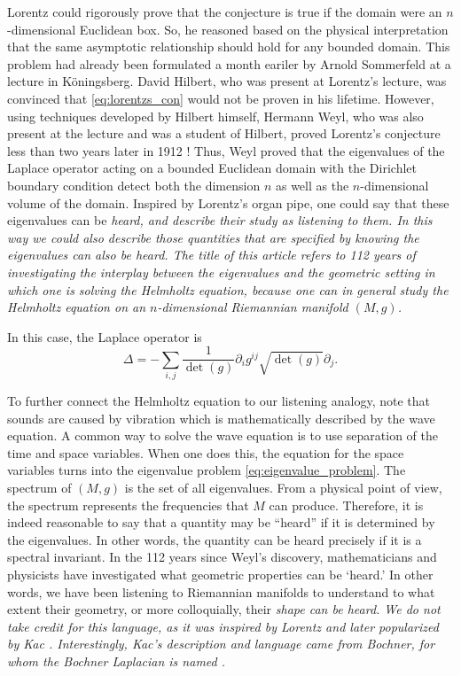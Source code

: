 \documentclass{amsart}
\theoremstyle{definition}
\begin{document}
Lorentz could rigorously prove that the conjecture is true if the domain were an $n$-dimensional Euclidean box. So, he reasoned based on the physical interpretation  that the same asymptotic relationship should hold for any bounded domain. This problem had already been formulated a month eariler by Arnold Sommerfeld at a lecture in Köningsberg. David Hilbert, who was present at Lorentz's lecture, was convinced that \eqref{eq:lorentzs_con} would not be proven in his lifetime. However, using techniques developed by Hilbert himself, Hermann Weyl, who was also present at the lecture and was a student of Hilbert, proved Lorentz's conjecture less than two years later in 1912 \cite{weyl1912asymptotische}!  Thus, Weyl proved that the eigenvalues of the Laplace operator acting on a bounded Euclidean domain with the Dirichlet boundary condition detect both the  dimension $n$ as well as the $n$-dimensional volume of the domain. Inspired by Lorentz's organ pipe, one could say that these eigenvalues can be \em heard, \em and describe their study as \em listening \em to them.  In this way we could also describe those quantities that are specified by knowing the eigenvalues can also be \em heard.  \em  The title of this article refers to 112 years of investigating the interplay between the eigenvalues and the geometric setting in which one is solving the Helmholtz equation, because one can in general study the Helmholtz equation on an $n$-dimensional Riemannian manifold $(M,g)$.  

In this case, the Laplace operator 
is 
\begin{equation} \label{eq:Laplace_(M,g)}
    \Delta = -\sum_{i,j} \frac{1}{\det(g)}\partial_i g^{ij}\sqrt{\det(g)}\partial_j.
\end{equation}

To further connect the Helmholtz equation to our listening analogy, note that sounds are caused by vibration which is mathematically described by the wave equation. A common way to solve the wave equation is to use separation of the time and space variables. When one does this, the equation for the space variables turns into the eigenvalue problem \eqref{eq:eigenvalue_problem}.  The spectrum of $(M,g)$ is the set of all eigenvalues.  From a physical point of view, the spectrum represents the frequencies that $M$ can produce. Therefore, it is indeed reasonable to say that a quantity may be “heard” if it is determined by the eigenvalues. In other words, the quantity can be heard precisely if it is a spectral invariant.  In the 112 years since Weyl's discovery, mathematicians and physicists have investigated what geometric properties can be `heard.'  In other words, we have been listening to Riemannian manifolds to understand to what extent their geometry, or more colloquially, their \em shape \em can be \em heard. \em  We do not take credit for this language, as it was inspired by Lorentz and later popularized by Kac \cite{kac1966can}.  Interestingly, Kac's description and language came from Bochner, for whom the Bochner Laplacian is named  \cite{morin2020spectral}. 
\end{document}
